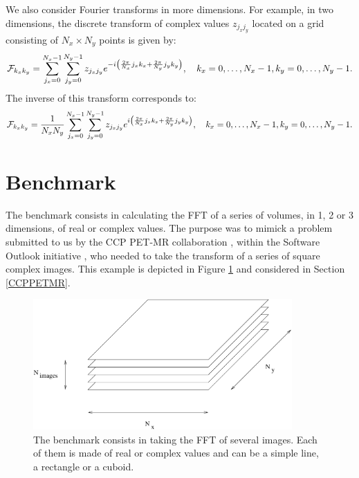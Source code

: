 \documentclass[12pt, a4paper]{article}
\begin{document}
We also consider Fourier transforms in more dimensions. For example, in two dimensions, the discrete transform of complex values $z_{j_x j_y}$ located on a grid consisting of $N_x \times N_y$ points is given by:
$$
{\cal F}_{k_x k_y}=\sum_{j_x=0}^{N_x-1} \sum_{j_y=0}^{N_y-1} z_{j_x j_y} e^{-i\left(\frac{2\pi}{N_x} j_x k_x+\frac{2\pi}{N_y} j_y k_y\right)}, \quad k_x=0,\ldots,N_x-1, k_y=0,\ldots,N_y-1.
$$
The inverse of this transform corresponds to:
$$
{\cal F}_{k_x k_y}=\frac{1}{N_xN_y}\sum_{j_x=0}^{N_x-1} \sum_{j_y=0}^{N_y-1} z_{j_x j_y} e^{i\left(\frac{2\pi}{N_x} j_x k_x+\frac{2\pi}{N_y} j_y k_y\right)}, \quad k_x=0,\ldots,N_x-1, k_y=0,\ldots,N_y-1.
$$
  
\section{Benchmark}

The benchmark \cite{code} consists in calculating the FFT of a series of volumes, in 1, 2 or 3 dimensions, of real or complex values. The purpose was to mimick a problem submitted to us by the CCP PET-MR collaboration \cite{ccppetmr}, within the Software Outlook initiative \cite{softwareoutlook}, who needed to take the transform of a series of square complex images. This example is depicted in Figure \ref{benchmark} and considered in Section \ref{CCPPETMR}.\\

\begin{figure}[H]
\captionsetup{width=0.6\textwidth}
\centering
\includegraphics[height=5cm]{benchmark.pdf}
\caption{The benchmark consists in taking the FFT of several images. Each of them is made of real or complex values and can be a simple line, a rectangle or a cuboid.}
\label{benchmark}
\end{figure}
\end{document}
